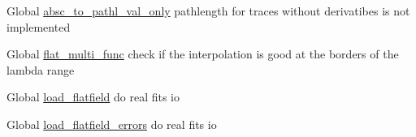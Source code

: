 \label{todo__todo000004}
\hypertarget{todo__todo000004}{}
 
\begin{DoxyDescription}
\item[Global \hyperlink{spce__pathlength_8c_a43a6cbb6f2e1c9b05020c0af68570e5c}{absc\_\-to\_\-pathl\_\-val\_\-only} ]pathlength for traces without derivatibes is not implemented 
\end{DoxyDescription}

\label{todo__todo000003}
\hypertarget{todo__todo000003}{}
 
\begin{DoxyDescription}
\item[Global \hyperlink{spc__flatfield_8c_ad05bdab9660f9325c11b117b254d42e1}{flat\_\-multi\_\-func} ]check if the interpolation is good at the borders of the lambda range 
\end{DoxyDescription}

\label{todo__todo000001}
\hypertarget{todo__todo000001}{}
 
\begin{DoxyDescription}
\item[Global \hyperlink{spc__flatfield_8c_a1a2a238a4168103d4c9db69848e6fdd7}{load\_\-flatfield} ]do real fits io 
\end{DoxyDescription}

\label{todo__todo000002}
\hypertarget{todo__todo000002}{}
 
\begin{DoxyDescription}
\item[Global \hyperlink{spc__flatfield_8c_a0229b077b2df672da892c786e598710f}{load\_\-flatfield\_\-errors} ]do real fits io 
\end{DoxyDescription}